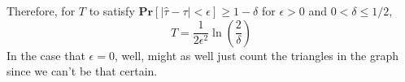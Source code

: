 Therefore, for $T$ to satisfy $\mathbf{Pr}[|\hat{\tau} - \tau| < \epsilon] \geq 1 - \delta$ for $\epsilon > 0$ and $0 < \delta \leq 1/2$,
\[ T = \frac{1}{2\epsilon^2}\ln\left(\frac{2}{\delta}\right) \]
In the case that $\epsilon = 0$, well, might as well just count the triangles in the graph since we can't be that certain.

